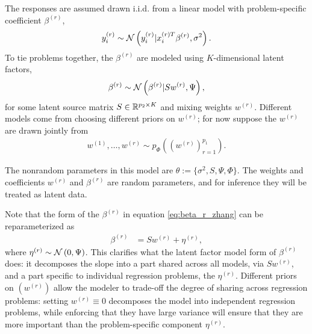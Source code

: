 \documentclass{article}
\begin{document}
The responses are assumed drawn i.i.d. from a linear model with problem-specific
coefficient $\beta^{(r)}$,
\begin{align*}
  y_{i}^{(r)} \sim \mathcal{N}\left(y_i^{(r)} \vert x_{i}^{(r) T}\beta^{(r)}, \sigma^{2}\right).
\end{align*}
To tie problems together, the $\beta^{(r)}$ are modeled using $K$-dimensional
latent factors,
\begin{align}
  \beta^{(r)} \sim \mathcal{N}\left(\beta^{(r)} \vert S w^{(r)}, \Psi\right), \label{eq:beta_r_zhang}
\end{align}
for some latent source matrix $S \in \mathbb{R}^{p_{2} \times K}$ and mixing weights
$w^{(r)}$. Different models come from choosing different priors on $w^{(r)}$;
for now suppose the $w^{(r)}$ are drawn jointly from
\begin{align*}
w^{(1)}, \dots, w^{(r)} \sim  p_{\Phi}\left(\left(w^{\left(r\right)}\right)_{r = 1}^{p_{1}}\right).
\end{align*}

The nonrandom parameters in this model are $\theta := \{\sigma^{2}, S, \Psi,
\Phi\}$. The weights and coefficients $w^{(r)}$ and $\beta^{(r)}$ are random
parameters, and for inference they will be treated as latent data.

Note that the form of the $\beta^{(r)}$ in equation \ref{eq:beta_r_zhang} can
be reparameterized as
\begin{align*}
\beta^{(r)} &= Sw^{(r)} + \eta^{(r)},
\end{align*}
where $\eta^{(r)} \sim \mathcal{N}\left(0, \Psi\right)$. This clarifies what the latent
factor model form of $\beta^{(r)}$ does: it decomposes the slope into a part
shared across all models, via $Sw^{(r)}$, and a part specific to individual
regression problems, the $\eta^{(r)}$. Different priors on
$\left(w^{(r)}\right)$ allow the modeler to trade-off the degree of sharing
across regression problems: setting $w^{(r)} \equiv 0$ decomposes the model into
independent regression problems, while enforcing that they have large variance
will ensure that they are more important than the problem-specific component
$\eta^{(r)}$.
\end{document}
